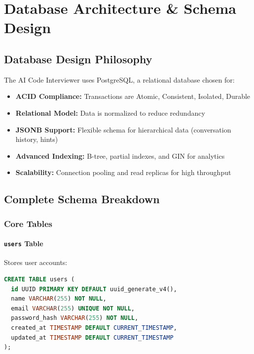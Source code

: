 \documentclass[12pt,a4paper,oneside]{article}
\newcommand{\database}[1]{\texttt{#1}}
\begin{document}

\section{Database Architecture \& Schema Design}

\subsection{Database Design Philosophy}

The AI Code Interviewer uses PostgreSQL, a relational database chosen for:

\begin{itemize}
    \item \textbf{ACID Compliance:} Transactions are Atomic, Consistent, Isolated, Durable
    \item \textbf{Relational Model:} Data is normalized to reduce redundancy
    \item \textbf{JSONB Support:} Flexible schema for hierarchical data (conversation history, hints)
    \item \textbf{Advanced Indexing:} B-tree, partial indexes, and GIN for analytics
    \item \textbf{Scalability:} Connection pooling and read replicas for high throughput
\end{itemize}

\subsection{Complete Schema Breakdown}

\subsubsection{Core Tables}

\paragraph{\database{users} Table}

Stores user accounts:

\begin{lstlisting}[language=SQL, caption=Users Table Schema]
CREATE TABLE users (
  id UUID PRIMARY KEY DEFAULT uuid_generate_v4(),
  name VARCHAR(255) NOT NULL,
  email VARCHAR(255) UNIQUE NOT NULL,
  password_hash VARCHAR(255) NOT NULL,
  created_at TIMESTAMP DEFAULT CURRENT_TIMESTAMP,
  updated_at TIMESTAMP DEFAULT CURRENT_TIMESTAMP
);
\end{lstlisting}
\end{document}
